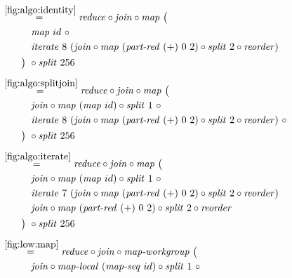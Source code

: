\begin{align*}
%
  &\hspace{-2em}\quad\begin{aligned}
    &\overset{\ref{fig:algo:identity}}{=\hspace{.2em}}
      \reduce \circ \join \circ \map\ \big(\\
    &\qquad\quad\map\ id\ \circ \\
    &\qquad\quad\iterateN\ 8\ (\join \circ \map\ (\partRed\ (+)\ 0\ 2) \circ \splitN\ 2\circ \reorder)\\
    &\qquad\big)\ \circ \splitN\ 256
  \end{aligned}\\[.5em]
%
  &\hspace{-2em}\quad\begin{aligned}
    &\overset{\ref{fig:algo:splitjoin}}{=\hspace{.2em}}
      \reduce \circ \join \circ \map\ \big(\\
    &\qquad\quad\join \circ \map\ (\map\ id) \circ \splitN\ 1\ \circ\\
    &\qquad\quad\iterateN\ 8\ (\join \circ \map\ (\partRed\ (+)\ 0\ 2) \circ \splitN\ 2\circ \reorder)\ \circ\\
    &\qquad\big)\ \circ \splitN\ 256
  \end{aligned}\\[.5em]
%
  &\hspace{-2em}\quad\begin{aligned}
    &\overset{\ref{fig:algo:iterate}}{=\hspace{.2em}}
      \reduce \circ \join \circ \map\ \big(\\
    &\qquad\quad\join \circ \map\ (\map\ id) \circ \splitN\ 1\ \circ\\
    &\qquad\quad\iterateN\ 7\ (\join \circ \map\ (\partRed\ (+)\ 0\ 2) \circ \splitN\ 2\circ \reorder)\\
    &\qquad\quad\join \circ \map\ (\partRed\ (+)\ 0\ 2) \circ \splitN\ 2\circ \reorder\\
    &\qquad\big)\ \circ \splitN\ 256
  \end{aligned}\\[.5em]
%
  &\hspace{-2em}\quad\begin{aligned}
    &\overset{\ref{fig:low:map}}{=\hspace{.2em}}
      \reduce \circ \join \circ \mapWorkgroup\ \big(\\
    &\qquad\quad\join \circ \mapLocal\ (\mapSeq\ id) \circ \splitN\ 1\ \circ\\

\end{aligned}
\end{align*}
